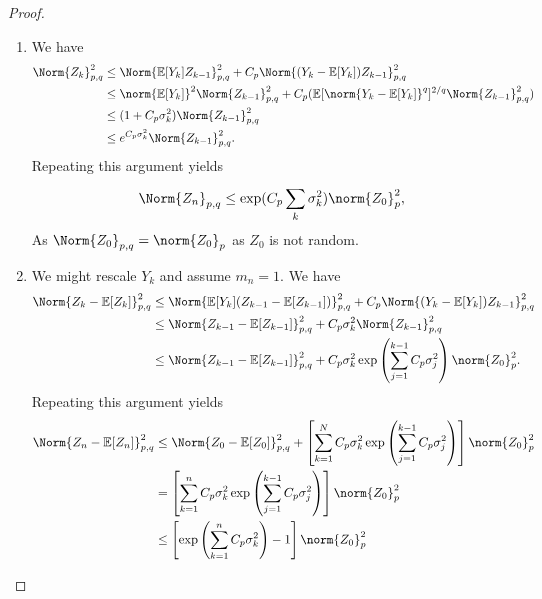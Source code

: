 \begin{proof}
  \begin{enumerate}[1)]
    \item We have 
    \begin{align*}
      \Norm{Z_k}_{p,q}^{2} &\leq \Norm{\mathbb{E}[Y_k]Z_{k-1}}_{p,q}^{2} + C_p \Norm{(Y_k-\mathbb{E}[Y_k])Z_{k-1}}_{p,q}^{2} \\
                           & \leq \norm{\mathbb{E}[Y_k]}_{}^{2} \Norm{Z_{k-1}}_{p,q}^{2}+C_p (\mathbb{E}[\norm{Y_k-\mathbb{E}[Y_k]}_{}^{q}]^{2/q} \Norm{Z_{k-1}}_{p,q}^{2}) \\
                           & \leq (1+C_p \sigma_k^{2}) \Norm{Z_{k-1}}_{p,q}^{2} \\
                           & \leq e^{C_p \sigma_k^{2}} \Norm{Z_{k-1}}_{p,q}^{2}.
    \end{align*}
    Repeating this argument yields 
    \[ \Norm{Z_n}_{p,q} \leq \exp(C_p \sum_{k}^{} \sigma_k^{2} )\norm{Z_0}_{p}^{2}, \]
    As \( \Norm{Z_0}_{p,q}=\norm{Z_0}_{p} \) as \( Z_0 \) is not random.
  \item We might rescale \( Y_k \) and assume \( m_n=1 \). We have 
    \begin{align*}
      \Norm{Z_{k}-\mathbb{E}[Z_k]}_{p,q}^{2} & \leq \Norm{ \mathbb{E}[Y_k](Z_{k-1}-\mathbb{E}[Z_{k-1}])}_{p,q}^{2} + C_p \Norm{(Y_k-\mathbb{E}[Y_k])Z_{k-1}}_{p,q}^{2} \\
                                             & \leq \Norm{Z_{k-1}-\mathbb{E}[Z_{k-1}]}_{p,q}^{2} + C_p \sigma_k^{2} \Norm{Z_{k-1}}_{p,q}^{2} \\
                                             & \leq \Norm{Z_{k-1}-\mathbb{E}[Z_{k-1}]}_{p,q}^{2} + C_p \sigma_k^{2} \exp\left(\sum_{j=1}^{k-1}C_p \sigma_j^{2}\right) \norm{Z_0}_{p}^{2} .
    \end{align*}
    Repeating this argument yields
    \begin{align*}
      \Norm{Z_n-\mathbb{E}[Z_n]}_{p,q}^{2}& \leq \Norm{Z_0 - \mathbb{E}[Z_0]}_{p,q}^{2} + \left[\sum_{k=1}^{N}C_p \sigma_k^{2} \exp\left(\sum_{j=1}^{k-1} C_p \sigma_j^{2}\right)\right] \norm{Z_0}_{p}^{2} \\
      &= \left[\sum_{k=1}^{n} C_p \sigma_k^{2} \exp\left(\sum_{j=1}^{k-1}C_p \sigma_{j}^{2}\right)\right] \norm{Z_0}_{p}^{2} \\
      &\leq \left[\exp\left(\sum_{k=1}^{n}C_p \sigma_k^{2}\right)-1\right] \norm{Z_0}_p^{2}
    \end{align*}
\end{enumerate}
\end{proof}


